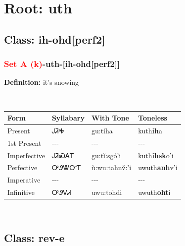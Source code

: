 \needspace{4in}
\section*{Root: uth}
\nopagebreak
{}
\needspace{3in}
\subsection*{Class: ih-ohd[perf2]}
\nopagebreak
\needspace{2in}
\subsubsection*{\textcolor{Red}{Set A (k)}{-}\textbf{uth}{-}[ih-ohd[perf2]]}
\nopagebreak
\textbf{Definition: } it{\textquoteright}s snowing
\\[0.5em]
\begin{tabularx}{\textwidth}{l X X X}%
\toprule%
\textbf{Form}&\textbf{Syllabary}&\textbf{With Tone}&\textbf{Toneless}\\%
\midrule%
Present&ᎫᏘᎭ&gu:tíha&kuth\textbf{ih}a\\%
1st Present&{-}{-}{-}&{-}{-}{-}&{-}{-}{-}\\%
Imperfective&ᎫᏘᏍᎪᎢ&gu:tǐ:sgó’i&kuth\textbf{ihsk}o'i\\%
Perfective&ᎤᏭᏔᏅᎢ&ù:wu:tahnv̌:’i&uwuth\textbf{anh}v'i\\%
Imperative&{-}{-}{-}&{-}{-}{-}&{-}{-}{-}\\%
Infinitive&ᎤᏭᏙᏗ&uwu:tohdi&uwuth\textbf{oht}i\\%
\bottomrule%
\end{tabularx}
\\[1em]
\needspace{3in}
\subsection*{Class: rev-e}
\nopagebreak
\needspace{2in}
